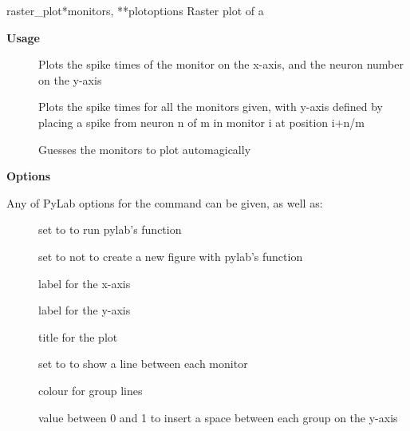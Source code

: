 \documentclass[letterpaper,10pt]{manual}
\begin{document}
\hypertarget{brian.raster_plot}{}\begin{funcdesc}{raster\_plot}{*monitors, **plotoptions}
Raster plot of a \hyperlink{brian.SpikeMonitor}{}

\textbf{Usage}
\begin{description}
\item[]
Plots the spike times of the monitor
on the x-axis, and the neuron number on the y-axis

\item[]
Plots the spike times
for all the monitors given, with y-axis defined by placing a spike
from neuron n of m in monitor i at position i+n/m

\item[]
Guesses the monitors to plot automagically

\end{description}

\textbf{Options}

Any of PyLab options for the  command can be given, as well as:
\begin{description}
\item[]
set to  to run pylab's  function

\item[]
set to  not to create a new figure with pylab's  function

\item[]
label for the x-axis

\item[]
label for the y-axis

\item[]
title for the plot

\item[]
set to  to show a line between each monitor

\item[]
colour for group lines

\item[]
value between 0 and 1 to insert a space between
each group on the y-axis

\end{description}
\end{funcdesc}
\end{document}
